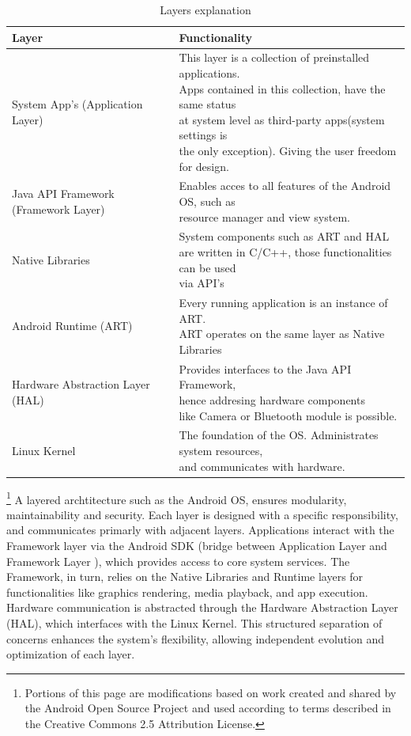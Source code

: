{	
	\begin{table}[h!]
		\begin{center}
			\caption{Layers explanation}
			\label{tab:stackLayersTable}
			\begin{tabular}{l|l} %
				\textbf{Layer} & \textbf{Functionality} \\
				\hline
				System App's (Application Layer)& \makecell[l]{This layer is a collection of preinstalled applications. \\ Apps contained in this collection, have the same status \\ at system level as third-party apps(system settings is\\ the only exception). Giving the user freedom for design.  }\\
				\hline
				Java API Framework (Framework Layer)& \makecell[l]{Enables acces to all features of the Android OS, such as \\resource manager  and view system.}  \\
				\hline
				Native Libraries& \makecell[l]{System components such as ART and HAL \\are written in C/C++, those functionalities can be used \\ via API's} \\
				\hline
				Android Runtime (ART)& \makecell[l]{Every running application is an instance of ART. \\ ART operates on the same layer as Native Libraries}\\
				\hline
				Hardware Abstraction Layer (HAL) & \makecell[l]{Provides interfaces to the Java API Framework,\\ hence addresing hardware components\\ like Camera or Bluetooth module is possible.} \\
				\hline
				Linux Kernel & \makecell[l]{The foundation of the OS. Administrates system resources, \\ and communicates with hardware.}
			\end{tabular}
		\end{center}
	\end{table}
	\footnote{Portions of this page are modifications based on work created and shared by the Android Open Source Project and used according to terms described in the Creative Commons 2.5 Attribution License.}
	 A layered archtitecture such as the Android OS, ensures modularity, maintainability and security. Each layer is designed with a specific responsibility, and communicates primarly with adjacent layers. Applications interact with the Framework layer via the Android SDK (bridge between Application Layer and Framework Layer ), which provides access to core system services. The Framework, in turn, relies on the Native Libraries and Runtime layers for functionalities like graphics rendering, media playback, and app execution. Hardware communication is abstracted through the Hardware Abstraction Layer (HAL), which interfaces with the Linux Kernel. This structured separation of concerns enhances the system's flexibility, allowing independent evolution and optimization of each layer. \cite{AndroidStack}
}
